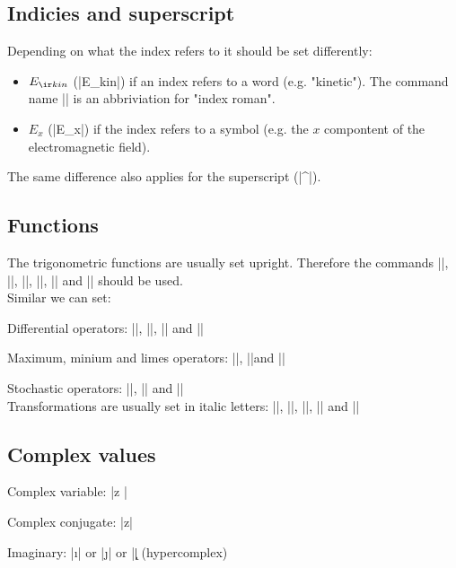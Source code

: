 \documentclass[english]{latex4ei_fs}
\begin{document}
\begin{sectionbox}
	\subsection{Indicies and superscript}
		Depending on what the index refers to it should be set differently:
		\begin{itemize}
			\item $E_{\ir kin}$ (\code|E_{\ir kin}|) if an index refers to a word (e.g. "kinetic"). The command name \code|\ir| is an abbriviation for  "index roman".
			\item $E_x$ (\code|E_x|) if the index refers to a symbol (e.g. the $x$ compontent of the electromagnetic field). \\
		\end{itemize}

		The same difference also applies for the superscript (\code|^|).
\end{sectionbox}

\begin{sectionbox}
	\subsection{Functions}
		The trigonometric functions are usually set upright. Therefore the commands \code|\exp|, \code|\sin|, \code|\cos|, \code|\sinh|, \code|\cosh| and \code|\sinc| should be used. \\

		Similar we can set: 

		Differential operators:  \code|\grad|, \code|\div|, \code|\rot| and \code|\lpo|

		Maximum, minium and limes operators: \code|\min|, \code|\max|and \code|\lim|				

		Stochastic operators: \code|\E|, \code|\Var| and \code|\Cov| \\

		Transformations are usually set in italic letters: \code|\FT|, \code|\LT|, \code|\DFT|, \code|\ZT| and \code|\DTFT|
\end{sectionbox}

\begin{sectionbox}
	\subsection{Complex values}

		Complex variable: \code|\cx z	|	

		Complex conjugate: \code|\cxc z|

		Imaginary: \code|\i| or \code|\j| or \code|\k| 	(hypercomplex)

\end{sectionbox}
\end{document}
